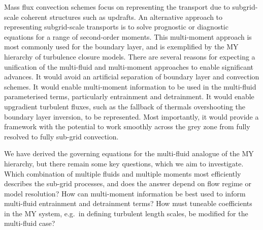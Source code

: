 \documentclass[11pt,a4paper]{article}
\begin{document}
Mass flux convection schemes focus on representing the transport due to subgrid-scale coherent structures such as
updrafts. An alternative approach to representing subgrid-scale transports is to solve prognostic or diagnostic
equations for a range of second-order moments. This multi-moment approach is most commonly used for the
boundary layer, and is exemplified by the \citet{mellor1973,mellor1974,mellor1982} MY hierarchy of turbulence
closure models.
There are several reasons for expecting a unification of the multi-fluid and multi-moment approaches to enable
significant advances. It would avoid an artificial separation of boundary layer and convection schemes.
It would enable multi-moment information to be used in the multi-fluid parameterised terms, particularly
entrainment and detrainment. It would enable upgradient turbulent fluxes, such as the fallback of thermals
overshooting the boundary layer inversion, to be represented. Most importantly, it would provide a framework
with the potential to work smoothly across the grey zone from fully resolved to fully sub-grid convection.

We have derived the governing equations for the multi-fluid analogue of the MY hierarchy, but there remain
some key questions, which we aim to investigate. Which combination of multiple fluids and multiple moments
most efficiently describes the sub-grid processes, and does the answer depend on flow regime or model resolution?
How can multi-moment information be best used to inform multi-fluid entrainment and detrainment terms?
How must tuneable coefficients in the MY system, e.g.\ in defining turbulent length scales, be modified
for the multi-fluid case?
\end{document}
